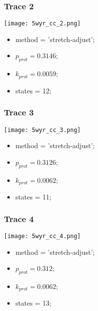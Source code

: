 \subsubsection{Trace 2}
\begin{minipage}[c]{0.7\textwidth}
    \texttt{[image: 5wyr\_cc\_2.png]}
\end{minipage}
\hfill
\begin{minipage}[c]{0.45\textwidth}
    \begin{itemize}
        \item method = 'stretch-adjust';
        \item $p_{prot}=0.3146$;
        \item $k_{prot}=0.0059$;
        \item states = 12;
    \end{itemize}
\end{minipage}

\subsubsection{Trace 3}
\begin{minipage}[c]{0.7\textwidth}
    \texttt{[image: 5wyr\_cc\_3.png]}
\end{minipage}
\hfill
\begin{minipage}[c]{0.45\textwidth}
    \begin{itemize}
        \item method = 'stretch-adjust';
        \item $p_{prot}=0.3126$;
        \item $k_{prot}=0.0062$;
        \item states = 11;
    \end{itemize}
\end{minipage}

\subsubsection{Trace 4}
\begin{minipage}[c]{0.7\textwidth}
    \texttt{[image: 5wyr\_cc\_4.png]}
\end{minipage}
\hfill
\begin{minipage}[c]{0.45\textwidth}
    \begin{itemize}
        \item method = 'stretch-adjust';
        \item $p_{prot}=0.312$;
        \item $k_{prot}=0.0062$;
        \item states = 13;
    \end{itemize}
\end{minipage}

